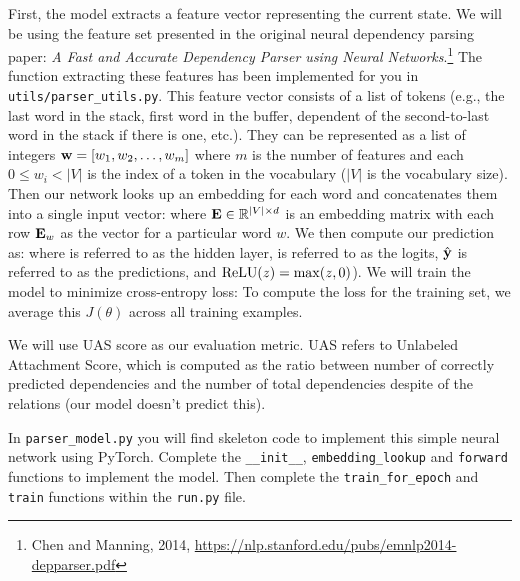 \begin{parts}
    First, the model extracts a feature vector representing the current state. We will be using the feature set presented in the original neural dependency parsing paper: {\it A Fast and Accurate Dependency Parser using Neural Networks}.\footnote{Chen and Manning, 2014, \url{https://nlp.stanford.edu/pubs/emnlp2014-depparser.pdf}} The function extracting these features has been implemented for you in \texttt{utils/parser\_utils.py}. This feature vector consists of a list of tokens (e.g., the last word in the stack, first word in the buffer, dependent of the second-to-last word in the stack if there is one, etc.). They can be represented as a list of integers $\mathbf{w} = [w_1, w_2, \dots, w_m]$ where $m$ is the number of features and each $0 \leq w_i < |V|$ is the index of a token in the vocabulary ($|V|$ is the vocabulary size). Then our network looks up an embedding for each word and concatenates them into a single input vector:
    where $\mathbf{E} \in \mathbb{R}^{|V| \times d}$ is an embedding matrix with each row $\mathbf{E}_w$ as the vector for a particular word $w$. We then compute our prediction as:
    where \bh \space is referred to as the hidden layer, \bl \space is referred to as the logits, $\hat{\mathbf{y}}$ \space is referred to as the predictions, and $\operatorname{ReLU}(z) = \max(z, 0)$). We will train the model to minimize cross-entropy loss:
    To compute the loss for the training set, we average this $J(\theta)$ across all training examples.
    
    We will use UAS score as our evaluation metric. UAS refers to Unlabeled Attachment Score, which is computed as the ratio between number of correctly predicted dependencies and the number of total dependencies despite of the relations (our model doesn't predict this).\newline
    
   In \texttt{parser\_model.py} you will find skeleton code to implement this simple neural network using PyTorch. Complete the \texttt{\_\_init\_\_}, \texttt{embedding\_lookup} and \texttt{forward} functions to implement the model. Then complete the \texttt{train\_for\_epoch} and \texttt{train} functions within the \texttt{run.py} file.
   

\end{parts}
